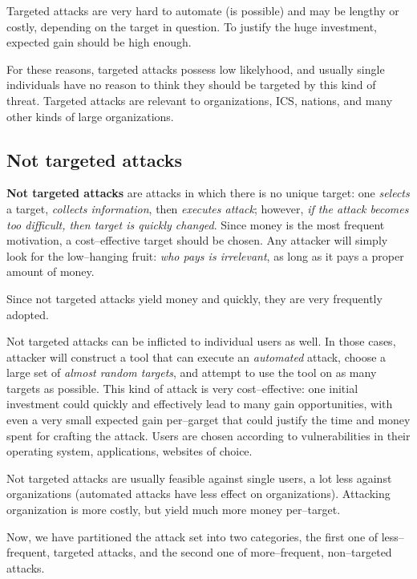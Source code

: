 \documentclass[10pt]{extreport}
\begin{document}
Targeted attacks are very hard to automate (is possible) and may be lengthy or
costly, depending on the target in question. To justify the huge investment,
expected gain should be high enough.

For these reasons, targeted attacks possess low likelyhood, and usually single
individuals have no reason to think they should be targeted by this kind of
threat. Targeted attacks are relevant to organizations, ICS, nations, and many
other kinds of large organizations.

\subsection{Not targeted attacks}

\textbf{Not targeted attacks} are attacks in which there is no unique target:
one \emph{selects} a target, \emph{collects information}, then \emph{executes
attack}; however, \emph{if the attack becomes too difficult, then target is
quickly changed}. Since money is the most frequent motivation, a
cost--effective target should be chosen. Any attacker will simply look for the
low--hanging fruit: \emph{who pays is irrelevant}, as long as it pays a proper
amount of money.

Since not targeted attacks yield money and quickly, they are very frequently
adopted.

Not targeted attacks can be inflicted to individual users as well.
In those cases, attacker will construct a tool that can execute an
\emph{automated} attack, choose a large set of \emph{almost random targets},
and attempt to use the tool on as many targets as possible. This kind of attack
is very cost--effective: one initial investment could quickly and effectively
lead to many gain opportunities, with even a very small expected gain
per--garget that could justify the time and money spent for crafting the
attack. Users are chosen according to vulnerabilities in their operating
system, applications, websites of choice.

Not targeted attacks are usually feasible against single users, a lot
less against organizations (automated attacks have less effect on
organizations). Attacking organization is more costly, but yield much more
money per--target.

\bigskip

Now, we have partitioned the attack set into two categories, the first one of
less--frequent, targeted attacks, and the second one of more--frequent,
non--targeted attacks.
\end{document}
